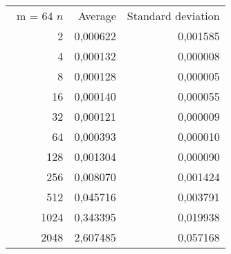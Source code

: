 \begin{tabular}{rrr}\
m = 64
 $n$ & Average & Standard deviation  \\
2 &  0,000622 &  0,001585 \\ 
4 &  0,000132 &  0,000008 \\ 
8 &  0,000128 &  0,000005 \\ 
16 &  0,000140 &  0,000055 \\ 
32 &  0,000121 &  0,000009 \\ 
64 &  0,000393 &  0,000010 \\ 
128 &  0,001304 &  0,000090 \\ 
256 &  0,008070 &  0,001424 \\ 
512 &  0,045716 &  0,003791 \\ 
1024 &  0,343395 &  0,019938 \\ 
2048 &  2,607485 &  0,057168 \\ 
\end{tabular}
